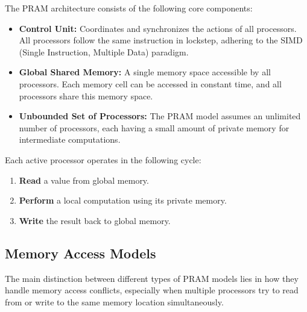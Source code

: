 \documentclass[12pt]{book}
\begin{document}
The PRAM architecture consists of the following core components:

\begin{itemize}
    \item \textbf{Control Unit:} Coordinates and synchronizes the actions of all processors. All processors follow the same instruction in lockstep, adhering to the SIMD (Single Instruction, Multiple Data) paradigm.
    
    \item \textbf{Global Shared Memory:} A single memory space accessible by all processors. Each memory cell can be accessed in constant time, and all processors share this memory space.
    
    \item \textbf{Unbounded Set of Processors:} The PRAM model assumes an unlimited number of processors, each having a small amount of private memory for intermediate computations.
\end{itemize}

Each active processor operates in the following cycle:
\begin{enumerate}
    \item \textbf{Read} a value from global memory.
    \item \textbf{Perform} a local computation using its private memory.
    \item \textbf{Write} the result back to global memory.
\end{enumerate}

\subsection{Memory Access Models}
The main distinction between different types of PRAM models lies in how they handle memory access conflicts, especially when multiple processors try to read from or write to the same memory location simultaneously.
\end{document}
